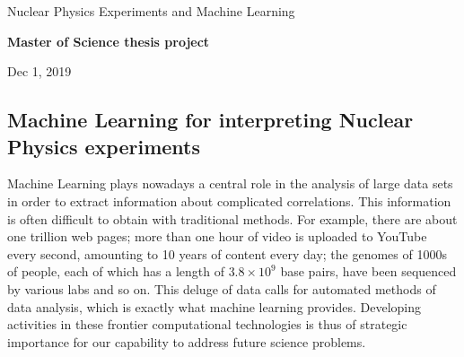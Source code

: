 \documentclass[%
oneside,                 %
final,                   %
10pt]{article}
\begin{document}

\newcommand{\exercisesection}[1]{\subsection*{#1}}






\thispagestyle{empty}

\begin{center}
{\LARGE\bf
\begin{spacing}{1.25}
Nuclear Physics Experiments and  Machine Learning
\end{spacing}
}
\end{center}


\begin{center}
{\bf Master of Science thesis project${}^{}$} \\ [0mm]
\end{center}

\begin{center}
\end{center}
    

\begin{center}
Dec 1, 2019
\end{center}

\vspace{1cm}


\subsection{Machine Learning for interpreting Nuclear Physics experiments}


Machine Learning plays nowadays a central role
in the analysis of large data sets in order to extract information
about complicated correlations. This information is often difficult to
obtain with traditional methods. For example, there are about one
trillion web pages; more than one hour of video is uploaded to YouTube
every second, amounting to 10 years of content every day; the genomes
of 1000s of people, each of which has a length of $3.8\times 10^9$
base pairs, have been sequenced by various labs and so on. This deluge
of data calls for automated methods of data analysis, which is exactly
what machine learning provides.  Developing activities in these
frontier computational technologies is thus of strategic importance
for our capability to address future science problems.
\end{document}

